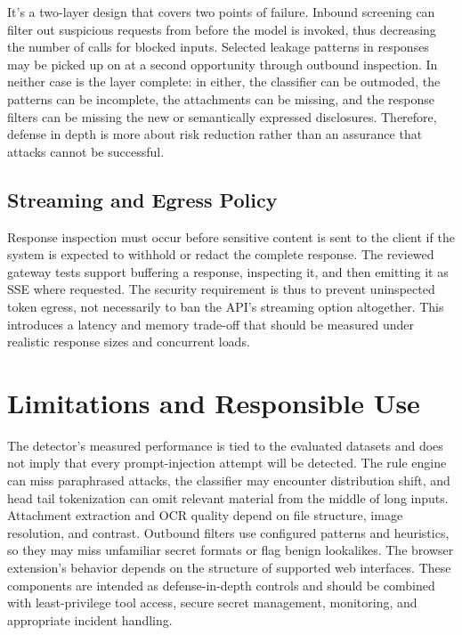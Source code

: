 \documentclass[conference]{IEEEtran}
\begin{document}
It's a two-layer design that covers two points of failure. Inbound screening can filter out suspicious requests from before the model is invoked, thus decreasing the number of calls for blocked inputs. Selected leakage patterns in responses may be picked up on at a second opportunity through outbound inspection. In neither case is the layer complete: in either, the classifier can be outmoded, the patterns can be incomplete, the attachments can be missing, and the response filters can be missing the new or semantically expressed disclosures. Therefore, defense in depth is more about risk reduction rather than an assurance that attacks cannot be successful.

\subsection{Streaming and Egress Policy}
Response inspection must occur before sensitive content is sent to the client if the system is expected to withhold or redact the complete response. The reviewed gateway tests support buffering a response, inspecting it, and then emitting it as SSE where requested. The security requirement is thus to prevent uninspected token egress, not necessarily to ban the API's streaming option altogether. This introduces a latency and memory trade-off that should be measured under realistic response sizes and concurrent loads.

\section{Limitations and Responsible Use}
The detector's measured performance is tied to the evaluated datasets and does not imply that every prompt-injection attempt will be detected. The rule engine can miss paraphrased attacks, the classifier may encounter distribution shift, and head tail tokenization can omit relevant material from the middle of long inputs. Attachment extraction and OCR quality depend on file structure, image resolution, and contrast. Outbound filters use configured patterns and heuristics, so they may miss unfamiliar secret formats or flag benign lookalikes. The browser extension's behavior depends on the structure of supported web interfaces. These components are intended as defense-in-depth controls and should be combined with least-privilege tool access, secure secret management, monitoring, and appropriate incident handling.
\end{document}
